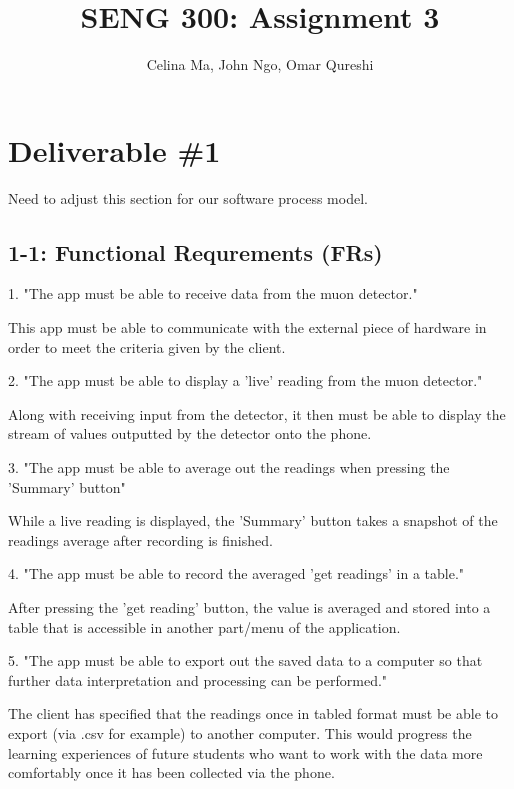 \documentclass[11pt,a4paper]{article}
\title{\vspace{-2.0cm} \textbf{SENG 300: Assignment 3}}
\author{Celina Ma, John Ngo, Omar Qureshi}
\begin{document}
\maketitle
\def\textfraction{.01}
\def\topfraction{.99}

\section*{Deliverable \#1}

Need to adjust this section for our software process model.


\subsection*{1-1: Functional Requrements (FRs)}

\vskip 3mm

1. "The app must be able to receive data from the muon detector."

This app must be able to communicate with the external piece of hardware in order to meet the criteria given by the client. 

\vskip 6mm

2. "The app must be able to display a 'live' reading from the muon detector."

Along with receiving input from the detector, it then must be able to display the stream of values outputted by the detector onto the phone. 

\vskip 6mm

3. "The app must be able to average out the readings when pressing the 'Summary' button"

While a live reading is displayed, the 'Summary' button takes a snapshot of the readings average after recording is finished. 

\vskip 6mm
4. "The app must be able to record the averaged  'get readings' in a table." 

After pressing the 'get reading' button, the value is averaged and stored into a table that is accessible in another part/menu of the application.

\vskip 6mm
5. "The app must be able to export out the saved data to a computer so that further data interpretation and processing can be performed."

The client has specified that the readings once in tabled format must be able to export (via .csv for example) to another computer. This would progress the learning experiences of future students who want to work with the data more comfortably once it has been collected via the phone.  
\end{document}
